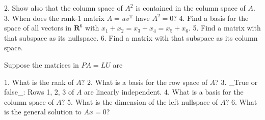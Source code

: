 2. Show also that the column space of \(A^{2}\) is contained in the column space of \(A\).
3. When does the rank-\(1\) matrix \(A=uv^{\mathrm{T}}\) have \(A^{2}=0\)?
4. Find a basis for the space of all vectors in \(\mathbf{R}^{6}\) with \(x_{1}+x_{2}=x_{3}+x_{4}=x_{5}+x_{6}\).
5. Find a matrix with that subspace as its nullspace.
6. Find a matrix with that subspace as its column space.

Suppose the matrices in \(\mathit{PA}=LU\) are

1. What is the rank of \(A\)?
2. What is a basis for the row space of \(A\)?
3. _True or false_: Rows 1, 2, 3 of \(A\) are linearly independent.
4. What is a basis for the column space of \(A\)?
5. What is the dimension of the left nullspace of \(A\)?
6. What is the general solution to \(Ax=0\)? 